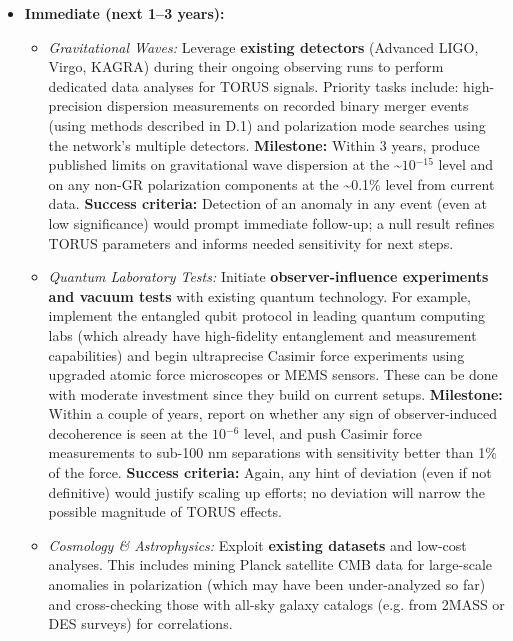 \documentclass[]{article}
\newcommand{\superscript}[1]{\ensuremath{^{\mathrm{#1}}}}
\begin{document}
\begin{itemize}
\item
  \textbf{Immediate (next 1--3 years):}

  \begin{itemize}
  \item
    \emph{Gravitational Waves:} Leverage \textbf{existing detectors}
    (Advanced LIGO, Virgo, KAGRA) during their ongoing observing runs to
    perform dedicated data analyses for TORUS signals. Priority tasks
    include: high-precision dispersion measurements on recorded binary
    merger events (using methods described in D.1) and polarization mode
    searches using the network's multiple detectors. \textbf{Milestone:}
    Within 3 years, produce published limits on gravitational wave
    dispersion at the \textasciitilde{}$10\superscript{−15}$ level and on
    any non-GR polarization components at the \textasciitilde{}0.1\%
    level from current data. \textbf{Success criteria:} Detection of an
    anomaly in any event (even at low significance) would prompt
    immediate follow-up; a null result refines TORUS parameters and
    informs needed sensitivity for next steps.
  \item
    \emph{Quantum Laboratory Tests:} Initiate \textbf{observer-influence
    experiments and vacuum tests} with existing quantum technology. For
    example, implement the entangled qubit protocol in leading quantum
    computing labs (which already have high-fidelity entanglement and
    measurement capabilities) and begin ultraprecise Casimir force
    experiments using upgraded atomic force microscopes or MEMS sensors.
    These can be done with moderate investment since they build on
    current setups. \textbf{Milestone:} Within a couple of years, report
    on whether any sign of observer-induced decoherence is seen at the
    $10\superscript{−6}$ level, and push Casimir force measurements to sub-100 nm
    separations with sensitivity better than 1\% of the force.
    \textbf{Success criteria:} Again, any hint of deviation (even if not
    definitive) would justify scaling up efforts; no deviation will
    narrow the possible magnitude of TORUS effects.
  \item
    \emph{Cosmology \& Astrophysics:} Exploit \textbf{existing datasets}
    and low-cost analyses. This includes mining Planck satellite CMB
    data for large-scale anomalies in polarization (which may have been
    under-analyzed so far) and cross-checking those with all-sky galaxy
    catalogs (e.g. from 2MASS or DES surveys) for correlations.

\end{itemize}
\end{itemize}
\end{document}
